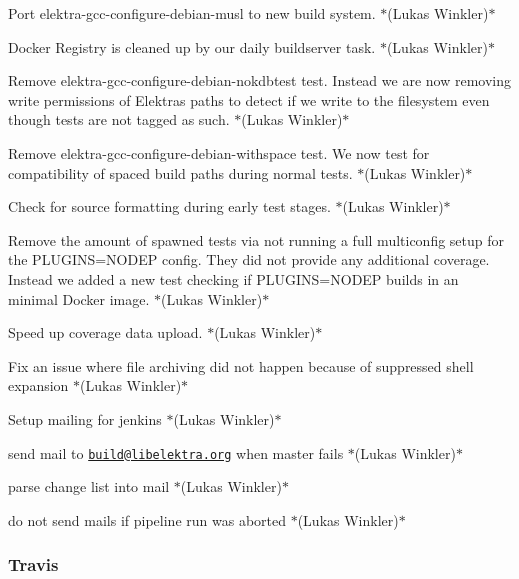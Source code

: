 \begin{DoxyItemize}
\item Port {\ttfamily elektra-\/gcc-\/configure-\/debian-\/musl} to new build system. $\ast$(Lukas Winkler)$\ast$
\item Docker Registry is cleaned up by our daily buildserver task. $\ast$(Lukas Winkler)$\ast$
\item Remove {\ttfamily elektra-\/gcc-\/configure-\/debian-\/nokdbtest} test. Instead we are now removing write permissions of Elektra\textquotesingle{}s paths to detect if we write to the filesystem even though tests are not tagged as such. $\ast$(Lukas Winkler)$\ast$
\item Remove {\ttfamily elektra-\/gcc-\/configure-\/debian-\/withspace} test. We now test for compatibility of spaced build paths during normal tests. $\ast$(Lukas Winkler)$\ast$
\item Check for source formatting during early test stages. $\ast$(Lukas Winkler)$\ast$
\item Remove the amount of spawned tests via not running a full multiconfig setup for the {\ttfamily P\+L\+U\+G\+I\+NS=N\+O\+D\+EP} config. They did not provide any additional coverage. Instead we added a new test checking if {\ttfamily P\+L\+U\+G\+I\+NS=N\+O\+D\+EP} builds in an minimal Docker image. $\ast$(Lukas Winkler)$\ast$
\item Speed up coverage data upload. $\ast$(Lukas Winkler)$\ast$
\item Fix an issue where file archiving did not happen because of suppressed shell expansion $\ast$(Lukas Winkler)$\ast$
\item Setup mailing for jenkins $\ast$(Lukas Winkler)$\ast$
\begin{DoxyItemize}
\item send mail to \href{mailto:build@libelektra.org}{\tt build@libelektra.\+org} when {\ttfamily master} fails $\ast$(Lukas Winkler)$\ast$
\item parse change list into mail $\ast$(Lukas Winkler)$\ast$
\item do not send mails if pipeline run was aborted $\ast$(Lukas Winkler)$\ast$
\end{DoxyItemize}
\end{DoxyItemize}

\subsubsection*{Travis}


